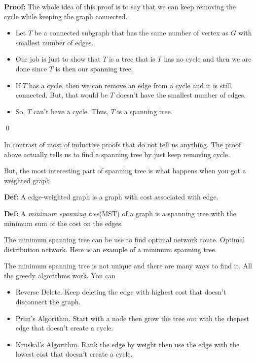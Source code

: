 \documentclass[a4paper, 12pt]{article}
\newcommand{\definition}{\vspace{1em}\noindent\textbf{Def:} }
\renewcommand{\proof}{\vspace{0.5em}\noindent\textbf{Proof:} }
\newcommand{\qedd}{\qed\newline}
\begin{document}
	\proof The whole idea of this proof is to say that we can keep removing the cycle while keeping the graph connected.
	\begin{itemize}
		\item Let $T$ be a connected subgraph that has the same number of vertex as $G$ with smallest number of edges.
		\item Our job is just to show that $T$ is a tree that is $T$ has no cycle and then we are done since $T$ is then our spanning tree.
		\item If $T$ has a cycle, then we can remove an edge from a cycle and it is still connected. But, that would be $T$ doesn't have the smallest number of edges.
		\item So, $T$ can't have a cycle. Thus, $T$ is a spanning tree.
	\end{itemize}
	\qedd
	
	In contrast of most of inductive proofs that do not tell us anything. The proof above actually tells us to find a spanning tree by just keep removing cycle.
	
	But, the most interesting part of spanning tree is what happens when you got a weighted graph.
	
	\definition A edge-weighted graph is a graph with cost associated with edge.
	
	\definition A \emph{minimum spanning tree}(MST) of a graph is a spanning tree with the minimum sum of the cost on the edges.
	
	The minimum spanning tree can be use to find optimal network route. Optimal distribution network. Here is an example of a minimum spanning tree.
	\begin{center}
	\end{center}
	The minimum spanning tree is not unique and there are many ways to find it. All the greedy algorithms work. You can
	\begin{itemize}
		\item Reverse Delete. Keep deleting the edge with highest cost that doesn't disconnect the graph.
		
		\item Prim's Algorithm. Start with a node then grow the tree out with the chepest edge that doesn't create a cycle.
		
		\item Kruskal's Algorithm. Rank the edge by weight then use the edge with the lowest cost that doesn't create a cycle.
	\end{itemize}
	
\end{document}

